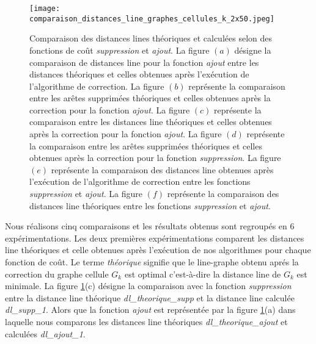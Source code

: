 \begin{figure}[htb!] 
\centering
\texttt{[image: comparaison\_distances\_line\_graphes\_cellules\_k\_2x50.jpeg]}
\caption{Comparaison des distances lines th\'eoriques et calcul\'ees selon des fonctions de co\^ut {\em suppression} et  {\em ajout}.
La figure $(a)$ d\'esigne la comparaison de distances line pour la fonction {\em ajout} entre les distances th\'eoriques et celles obtenues apr\`es l'ex\'ecution de l'algorithme de correction. 
La figure $(b)$ repr\'esente la comparaison entre les ar\^etes supprim\'ees th\'eoriques et celles obtenues apr\`es la correction pour la fonction {\em ajout}.
La figure $(c)$ repr\'esente la comparaison entre les distances line th\'eoriques et celles obtenues apr\`es la correction pour la fonction {\em ajout}.
La figure $(d)$ repr\'esente la comparaison entre les ar\^etes supprim\'ees th\'eoriques et celles obtenues apr\`es la correction pour la fonction {\em suppression}.
La figure $(e)$ repr\'esente la comparaison des distances line obtenues apr\`es l'ex\'ecution de l'algorithme de correction entre les fonctions {\em suppression} et {\em ajout}.
La figure $(f)$ repr\'esente la comparaison des distances line th\'eoriques entre les fonctions {\em suppression} et {\em ajout}.
}
\label{comparaison_distances_line_graphes_cellules_k_2x50}
\end{figure}

Nous r\'ealisons cinq comparaisons et les r\'esultats obtenus sont regroup\'es en $6$ exp\'erimentations.
\newline
Les deux premi\`eres exp\'erimentations comparent les distances line th\'eoriques et celle obtenues apr\`es l'ex\'ecution de nos algorithmes pour chaque fonction de co\^ut. Le terme {\em th\'eorique} signifie que le line-graphe obtenu apr\'es la correction du graphe cellule $G_k$ est optimal c'est-\`a-dire la distance line de $G_k$ est minimale. 
La figure \ref{comparaison_distances_line_graphes_cellules_k_2x50}(c) d\'esigne la comparaison avec la fonction {\em suppression} entre la distance line th\'eorique {\em dl\_theorique\_supp} et la distance line calcul\'ee {\em dl\_supp\_1}. Alors que la fonction {\em ajout} est repr\'esent\'ee par la figure \ref{comparaison_distances_line_graphes_cellules_k_2x50}(a) dans laquelle nous comparons les distances line th\'eoriques {\em dl\_theorique\_ajout}  et calcul\'ees {\em dl\_ajout\_1}.  

